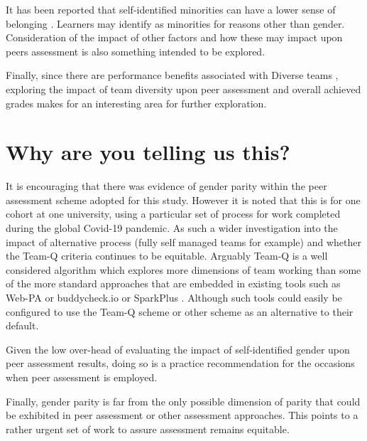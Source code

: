 \documentclass[sigconf, anonymous=true]{acmart}
\begin{document}
It has been reported that self-identified minorities can have a lower sense of belonging \cite{Mooney2020}. Learners may identify as minorities for reasons other than gender. Consideration of the impact of other factors and how these may impact upon peers assessment is also something intended to be explored.

Finally, since there are performance benefits associated with Diverse teams \cite{HBR206}, exploring the impact of team diversity upon peer assessment and overall achieved grades makes for an interesting area for further exploration.


\section{Why are you telling us this?}
It is encouraging that there was evidence of gender parity within the peer assessment scheme adopted for this study. However it is noted that this is for one cohort at one university, using a particular set of process for work completed during the global Covid-19 pandemic. As such a wider investigation into the impact of alternative process (fully self managed teams for example) and whether the Team-Q criteria continues to be equitable. Arguably Team-Q is a well considered algorithm which explores more dimensions of team working than some of the more standard approaches that are embedded in existing tools such as Web-PA \cite{WebPA} or buddycheck.io \cite{BuddyCheck} or SparkPlus \cite{SparkPlus}. Although such tools could easily be configured to use the Team-Q scheme or other scheme as an alternative to their default.

Given the low over-head of evaluating the impact of self-identified gender upon peer assessment results, doing so is a practice recommendation for the occasions when peer assessment is employed.

Finally, gender parity is far from the only possible dimension of parity that could be exhibited in peer assessment or other assessment approaches. This points to a rather urgent set of work to assure assessment remains equitable. 



\end{document}
